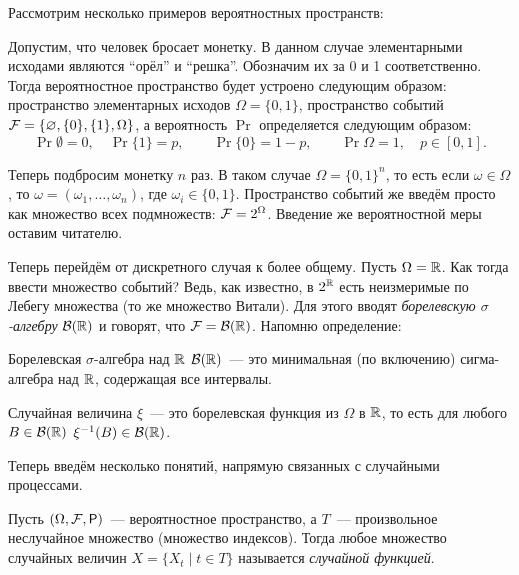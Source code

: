 Рассмотрим несколько примеров вероятностных пространств:

\begin{example}
	Допустим, что человек бросает монетку. В данном случае элементарными 
	исходами являются ``орёл'' и ``решка''.  Обозначим их за 0 и 1 
	соответственно. Тогда вероятностное пространство будет устроено следующим 
	образом: пространство элементарных исходов \(\Omega = \{0, 1\}\), 
	пространство событий \(\mathcal{F} = \{\varnothing, \{0\}, \{1\}, 
	\Omega\}\), а вероятность \(\Pr\) определяется следующим образом: 
	\[
		\Pr{\emptyset} = 0, \quad \Pr{\{1\}} = p, \quad \quad \Pr{\{0\}} = 1 - 
		p,\quad \quad \Pr{\Omega} = 1, \quad p \in [0, 1].
	\]
\end{example}

\begin{example}
	Теперь подбросим монетку \(n\) раз. В таком случае \(\Omega = \{0, 
	1\}^{n}\), то есть если \(\omega \in \Omega\), то \(\omega = (\omega_{1}, 
	\ldots, \omega_{n})\), где \(\omega_{i} \in \{0, 1\}\). Пространство 
	событий же введём просто как множество всех подмножеств: \(\mathcal{F} = 
	2^{\Omega}\). Введение же вероятностной меры оставим читателю.
\end{example}

\begin{example}
	Теперь перейдём от дискретного случая к более общему. Пусть \(\Omega = 
	\mathbb{R}\). Как тогда ввести множество событий? Ведь, как известно, в \(2^{\mathbb{R}}\) 
	есть неизмеримые по Лебегу множества (то же множество Витали). Для этого 
	вводят \emph{борелевскую \(\sigma\)-алгебру} \(\mathcal{B}(\mathbb{R})\) и говорят, что \(\mathcal{F} 
	= \mathcal{B}(\mathbb{R})\). Напомню определение:
\end{example}

\begin{definition}
	Борелевская \(\sigma\)-алгебра над \(\mathbb{R}\) \(\mathcal{B}(\mathbb{R})\)~--- это минимальная 
	(по включению) сигма-алгебра над \(\mathbb{R}\), содержащая все интервалы.
\end{definition}

\begin{definition}
	Случайная величина \(\xi\)~--- это борелевская функция из \(\Omega\) в 
	\(\mathbb{R}\), то есть для любого \(B \in \mathcal{B}(\mathbb{R})\) \(\xi^{-1}(B) \in \mathcal{B}(\mathbb{R})\).
\end{definition}

Теперь введём несколько понятий, напрямую связанных с случайными процессами.
\begin{definition}
	Пусть \((\Omega, \F, \Pr)\)~--- вероятностное пространство, а \(T\)~--- 
	произвольное неслучайное множество (множество индексов). Тогда любое 
	множество случайных величин \(X = \{X_{t} \mid t \in T\}\) называется 
	\emph{случайной функцией}.
\end{definition}

